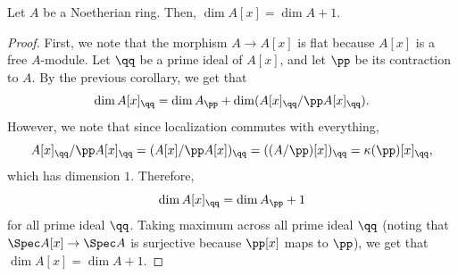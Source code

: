 \begin{corollary}
    \label{cor:dim_poly}
    Let $A$ be a Noetherian ring. Then, $\dim A[x] = \dim A+1$.
\end{corollary}
\begin{proof}
    First, we note that the morphism $A\to A[x]$ is flat
    because $A[x]$ is a free $A$-module.
    Let $\qq$ be a prime ideal of $A[x]$, and let 
    $\pp$ be its contraction to $A$. By the previous corollary,
    we get that
    $$\dim A[x]_\qq = \dim A_\pp + \dim(A[x]_\qq / \pp A[x]_\qq).$$
    However, we note that since localization commutes 
    with everything,
    $$A[x]_\qq / \pp A[x]_\qq = (A[x] / \pp A[x])_{\qq} 
    = ((A/\pp)[x])_{\qq} = \kappa(\pp)[x]_\qq,$$
    which has dimension $1$. Therefore,
    $$\dim A[x]_\qq = \dim A_\pp + 1$$
    for all prime ideal $\qq$. Taking maximum across
    all prime ideal $\qq$ (noting that $\Spec A[x] \to \Spec A$
    is surjective because $\pp[x]$ maps to $\pp$),
    we get that $\dim A[x]=\dim A+1$.
\end{proof}
